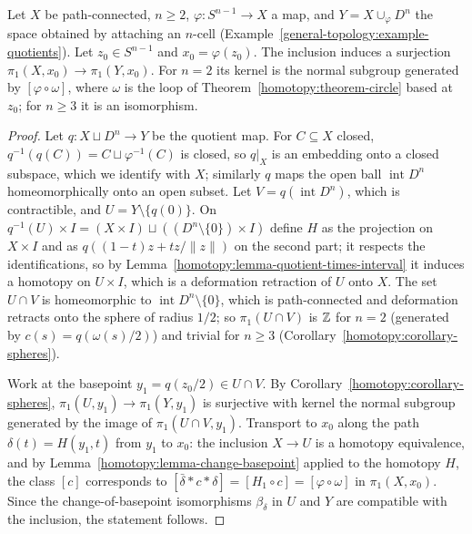 \begin{proposition}\label{homotopy:proposition-attaching-cells}
Let $X$ be path-connected, $n \geq 2$, $\varphi \colon S^{n-1} \to X$ a map, and $Y = X \cup_\varphi D^n$ the space obtained by attaching an $n$-cell
(Example~\ref{general-topology:example-quotients}). Let $z_0 \in S^{n-1}$ and $x_0 = \varphi(z_0)$. The inclusion induces a surjection
$\pi_1(X, x_0) \to \pi_1(Y, x_0)$. For $n = 2$ its kernel is the normal subgroup generated by $[\varphi \circ \omega]$, where $\omega$ is the loop of
Theorem~\ref{homotopy:theorem-circle} based at $z_0$; for $n \geq 3$ it is an isomorphism.
\end{proposition}

\begin{proof}
Let $q \colon X \sqcup D^n \to Y$ be the quotient map. For $C \subseteq X$ closed, $q^{-1}(q(C)) = C \sqcup \varphi^{-1}(C)$ is closed, so $q|_X$ is an embedding onto a
closed subspace, which we identify with $X$; similarly $q$ maps the open ball $\operatorname{int} D^n$ homeomorphically onto an open subset. Let
$V = q(\operatorname{int} D^n)$, which is contractible, and $U = Y \setminus \{q(0)\}$. On $q^{-1}(U) \times I = (X \times I) \sqcup ((D^n \setminus \{0\}) \times I)$ define
$H$ as the projection on $X \times I$ and as $q((1 - t)z + tz/\|z\|)$ on the second part; it respects the identifications, so by
Lemma~\ref{homotopy:lemma-quotient-times-interval} it induces a homotopy on $U \times I$, which is a deformation retraction of $U$ onto $X$. The set
$U \cap V$ is homeomorphic to $\operatorname{int} D^n \setminus \{0\}$, which is path-connected and deformation retracts onto the sphere of radius $1/2$; so
$\pi_1(U \cap V)$ is $\mathbb{Z}$ for $n = 2$ (generated by $c(s) = q(\omega(s)/2)$) and trivial for $n \geq 3$ (Corollary~\ref{homotopy:corollary-spheres}).

Work at the basepoint $y_1 = q(z_0/2) \in U \cap V$. By Corollary~\ref{homotopy:corollary-spheres}, $\pi_1(U, y_1) \to \pi_1(Y, y_1)$ is surjective with kernel the
normal subgroup generated by the image of $\pi_1(U \cap V, y_1)$. Transport to $x_0$ along the path $\delta(t) = H(y_1, t)$ from $y_1$ to $x_0$: the inclusion
$X \to U$ is a homotopy equivalence, and by Lemma~\ref{homotopy:lemma-change-basepoint} applied to the homotopy $H$, the class $[c]$ corresponds to
$[\bar\delta * c * \delta] = [H_1 \circ c] = [\varphi \circ \omega]$ in $\pi_1(X, x_0)$. Since the change-of-basepoint isomorphisms $\beta_\delta$ in $U$ and $Y$ are
compatible with the inclusion, the statement follows.
\end{proof}

